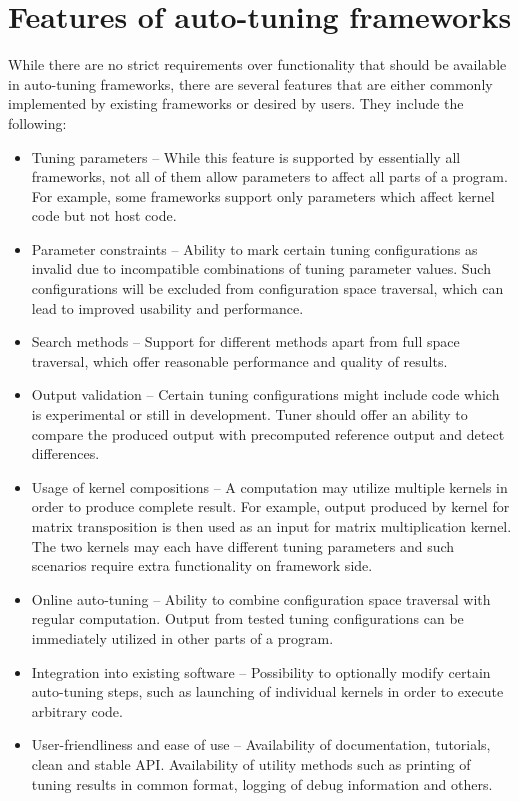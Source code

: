 \documentclass
[
    digital, %
    oneside, %
    table, %
    nolof, %
    nolot, %
    nocover %
]{fithesis3}
\begin{document}
\section{Features of auto-tuning frameworks}
While there are no strict requirements over functionality that should be available in auto-tuning frameworks, there are several features that are either
commonly implemented by existing frameworks or desired by users. They include the following: 
\begin{itemize}
    \item Tuning parameters -- While this feature is supported by essentially all frameworks, not all of them allow parameters to affect
    all parts of a program. For example, some frameworks support only parameters which affect kernel code but not host code.
    \item Parameter constraints -- Ability to mark certain tuning configurations as invalid due to incompatible combinations of tuning parameter values.
    Such configurations will be excluded from configuration space traversal, which can lead to improved usability and performance.
    \item Search methods -- Support for different methods apart from full space traversal, which offer reasonable performance and quality of results.
    \item Output validation -- Certain tuning configurations might include code which is experimental or still in development. Tuner should offer
    an ability to compare the produced output with precomputed reference output and detect differences.
    \item Usage of kernel compositions -- A computation may utilize multiple kernels in order to produce complete result. For example, output produced
    by kernel for matrix transposition is then used as an input for matrix multiplication kernel. The two kernels may each have different tuning
    parameters and such scenarios require extra functionality on framework side.
    \item Online auto-tuning -- Ability to combine configuration space traversal with regular computation. Output from tested tuning configurations can
    be immediately utilized in other parts of a program.
    \item Integration into existing software -- Possibility to optionally modify certain auto-tuning steps, such as launching of individual kernels in
    order to execute arbitrary code.
    \item User-friendliness and ease of use -- Availability of documentation, tutorials, clean and stable API. Availability of utility methods such
    as printing of tuning results in common format, logging of debug information and others.
\end{itemize}
\end{document}
